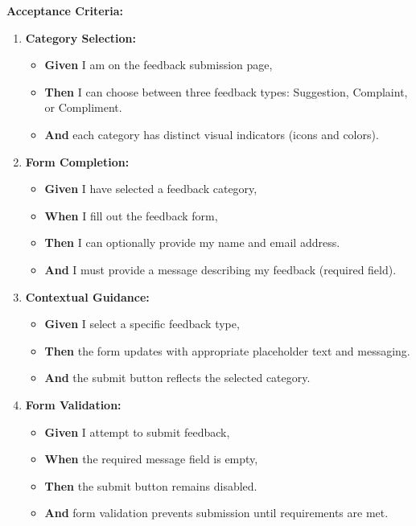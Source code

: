 \documentclass[12pt]{article}
\begin{document}
\vspace{1em}
\textbf{Acceptance Criteria:}
\begin{enumerate}
    \item \textbf{Category Selection:}
    \begin{itemize}
        \item \textbf{Given} I am on the feedback submission page,
        \item \textbf{Then} I can choose between three feedback types: Suggestion, Complaint, or Compliment.
        \item \textbf{And} each category has distinct visual indicators (icons and colors).
    \end{itemize}

    \item \textbf{Form Completion:}
    \begin{itemize}
        \item \textbf{Given} I have selected a feedback category,
        \item \textbf{When} I fill out the feedback form,
        \item \textbf{Then} I can optionally provide my name and email address.
        \item \textbf{And} I must provide a message describing my feedback (required field).
    \end{itemize}

    \item \textbf{Contextual Guidance:}
    \begin{itemize}
        \item \textbf{Given} I select a specific feedback type,
        \item \textbf{Then} the form updates with appropriate placeholder text and messaging.
        \item \textbf{And} the submit button reflects the selected category.
    \end{itemize}

    \item \textbf{Form Validation:}
    \begin{itemize}
        \item \textbf{Given} I attempt to submit feedback,
        \item \textbf{When} the required message field is empty,
        \item \textbf{Then} the submit button remains disabled.
        \item \textbf{And} form validation prevents submission until requirements are met.
    \end{itemize}


\end{enumerate}
\end{document}
